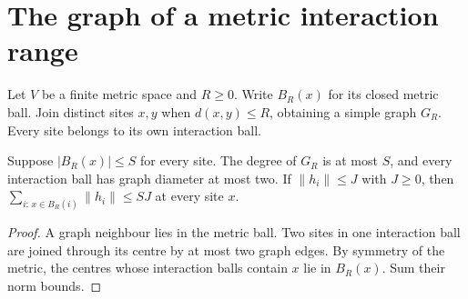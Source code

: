 \section{The graph of a metric interaction range}
\label{sec:gaussian_filtered_metric_interaction_graph}

\begin{definition}
    \label{def:hastings05_metric_interaction_graph}
    \leanok
    Let $V$ be a finite metric space and $R\ge0$. Write $B_R(x)$ for its
    closed metric ball. Join distinct sites $x,y$ when $d(x,y)\le R$, obtaining
    a simple graph $G_R$. Every site belongs to its own interaction ball.
\end{definition}

\begin{lemma}
    \label{thm:hastings05_metric_interaction_data}
    \leanok
    Suppose $|B_R(x)|\le S$ for every site. The degree of $G_R$ is at most
    $S$, and every interaction ball has graph diameter at most two. If
    $\|h_i\|\le J$ with $J\ge0$, then
    $\sum_{i:\,x\in B_R(i)}\|h_i\|\le SJ$ at every site $x$.
\end{lemma}
\begin{proof}\leanok
    A graph neighbour lies in the metric ball. Two sites in one interaction
    ball are joined through its centre by at most two graph edges.
    By symmetry of the metric, the centres whose interaction balls contain
    $x$ lie in $B_R(x)$. Sum their norm bounds.
\end{proof}

